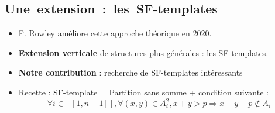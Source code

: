 \documentclass[graphics]{beamer}
\begin{document}
\subsection{Une~extension~:~les~SF-templates}
\begin{frame}
\begin{itemize}
\item F. Rowley améliore cette approche théorique en 2020.
\pause
\item \textbf{Extension verticale} de structures plus générales : les SF-templates.
\pause
\item \textbf{Notre contribution} : recherche de SF-templates intéressants
\pause
\item Recette : SF-template = Partition sans somme + condition suivante :
\[
\forall i \in [\![1, n-1]\!], \forall (x,y) \in A_i^2, x+y > p
\Longrightarrow x+y-p \notin A_i
\]
\end{itemize}
\end{frame}
\end{document}
